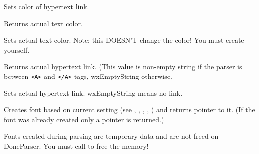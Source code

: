 Sets color of hypertext link.

\label{wxhtmlwinparsergetactualcolor}


Returns actual text color.

\label{wxhtmlwinparsersetactualcolor}


Sets actual text color. Note: this DOESN'T change the color! 
You must create  yourself.

\label{wxhtmlwinparsergetlink}


Returns actual hypertext link. (This value is non-empty string
if the parser is between {\tt <A>} and {\tt </A>} tags,
wxEmptyString otherwise.


\label{wxhtmlwinparsersetlink}


Sets actual hypertext link. wxEmptyString means no link.

\label{wxhtmlwinparsercreatecurrentfont}


Creates font based on current setting (see 
,
,
,
,
)
and returns pointer to it.
(If the font was already created only a pointer is returned.)

Fonts created during parsing are temporary data and are not freed on DoneParser. 
You must call 
to free the memory!
